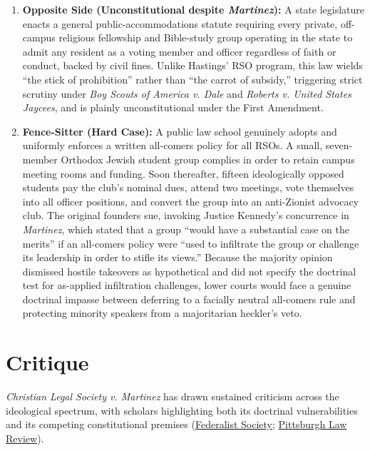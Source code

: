 \documentclass[12pt]{article}
\begin{document}
\begin{enumerate}
  \item \textbf{Opposite Side (Unconstitutional despite \textit{Martinez}):} A state legislature enacts a general public-accommodations statute requiring every private, off-campus religious fellowship and Bible-study group operating in the state to admit any resident as a voting member and officer regardless of faith or conduct, backed by civil fines. Unlike Hastings' RSO program, this law wields ``the stick of prohibition'' rather than ``the carrot of subsidy,'' triggering strict scrutiny under \textit{Boy Scouts of America v. Dale} and \textit{Roberts v. United States Jaycees}, and is plainly unconstitutional under the First Amendment.

  \item \textbf{Fence-Sitter (Hard Case):} A public law school genuinely adopts and uniformly enforces a written all-comers policy for all RSOs. A small, seven-member Orthodox Jewish student group complies in order to retain campus meeting rooms and funding. Soon thereafter, fifteen ideologically opposed students pay the club's nominal dues, attend two meetings, vote themselves into all officer positions, and convert the group into an anti-Zionist advocacy club. The original founders sue, invoking Justice Kennedy's concurrence in \textit{Martinez}, which stated that a group ``would have a substantial case on the merits'' if an all-comers policy were ``used to infiltrate the group or challenge its leadership in order to stifle its views.'' Because the majority opinion dismissed hostile takeovers as hypothetical and did not specify the doctrinal test for as-applied infiltration challenges, lower courts would face a genuine doctrinal impasse between deferring to a facially neutral all-comers rule and protecting minority speakers from a majoritarian heckler's veto.
\end{enumerate}

\section{Critique}

\textit{Christian Legal Society v. Martinez} has drawn sustained criticism across the ideological spectrum, with scholars highlighting both its doctrinal vulnerabilities and its competing constitutional premises (\href{https://fedsoc.org/case/christian-legal-society-v-martinez}{Federalist Society}; \href{https://lawreview.law.pitt.edu/ojs/lawreview/article/download/1172/737/2196}{Pittsburgh Law Review}).
\end{document}
